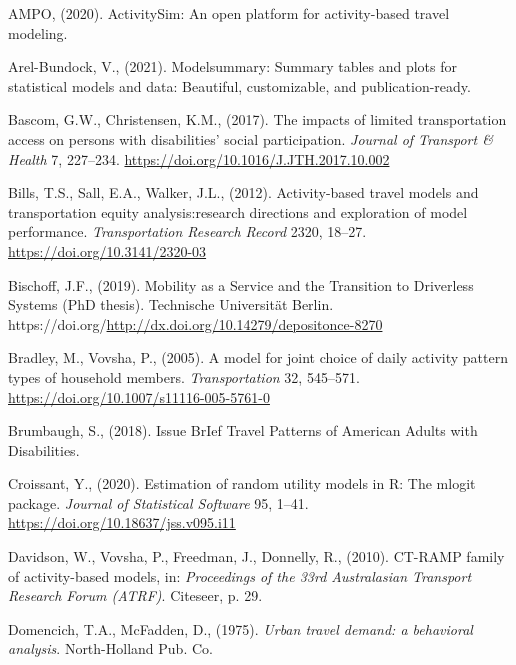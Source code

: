 \documentclass[3p, authoryear, review]{elsarticle} %
\newlength{\cslhangindent}
\newenvironment{CSLReferences}[2] %
 {%
  \setlength{\parindent}{0pt}
  \ifodd #1 \everypar{\setlength{\hangindent}{\cslhangindent}}\ignorespaces\fi
  \ifnum #2 > 0
  \setlength{\parskip}{#2\baselineskip}
  \fi
 }%
 {}
\begin{document}
\hypertarget{refs}{}
\begin{CSLReferences}{1}{0}
\leavevmode{}%
AMPO, (2020). ActivitySim: An open platform for activity-based travel modeling.

\leavevmode{}%
Arel-Bundock, V., (2021). Modelsummary: Summary tables and plots for statistical models and data: Beautiful, customizable, and publication-ready.

\leavevmode{}%
Bascom, G.W., Christensen, K.M., (2017). {The impacts of limited transportation access on persons with disabilities' social participation}. \emph{Journal of Transport {\&} Health} 7, 227--234. \url{https://doi.org/10.1016/J.JTH.2017.10.002}

\leavevmode{}%
Bills, T.S., Sall, E.A., Walker, J.L., (2012). Activity-based travel models and transportation equity analysis:research directions and exploration of model performance. \emph{Transportation Research Record} 2320, 18--27. \url{https://doi.org/10.3141/2320-03}

\leavevmode{}%
Bischoff, J.F., (2019). {Mobility as a Service and the Transition to Driverless Systems} (PhD thesis). Technische Universität Berlin. https://doi.org/\url{http://dx.doi.org/10.14279/depositonce-8270}

\leavevmode{}%
Bradley, M., Vovsha, P., (2005). {A model for joint choice of daily activity pattern types of household members}. \emph{Transportation} 32, 545--571. \url{https://doi.org/10.1007/s11116-005-5761-0}

\leavevmode{}%
Brumbaugh, S., (2018). {Issue BrIef Travel Patterns of American Adults with Disabilities}.

\leavevmode{}%
Croissant, Y., (2020). Estimation of random utility models in {R}: The {mlogit} package. \emph{Journal of Statistical Software} 95, 1--41. \url{https://doi.org/10.18637/jss.v095.i11}

\leavevmode{}%
Davidson, W., Vovsha, P., Freedman, J., Donnelly, R., (2010). CT-RAMP family of activity-based models, in: \emph{Proceedings of the 33rd Australasian Transport Research Forum (ATRF)}. Citeseer, p. 29.

\leavevmode{}%
Domencich, T.A., McFadden, D., (1975). \emph{{Urban travel demand: a behavioral analysis}}. North-Holland Pub. Co.


\end{CSLReferences}
\end{document}
